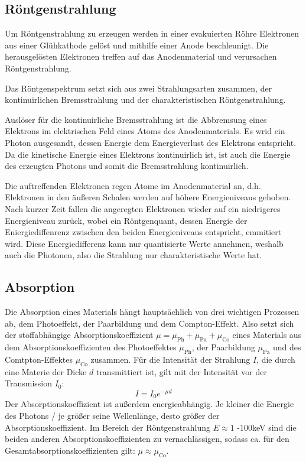 \documentclass[titlepage = firstcover]{scrartcl}
\begin{document}
      \subsection{Röntgenstrahlung}
        Um Röntgenstrahlung zu erzeugen werden in einer evakuierten Röhre Elektronen aus einer Glühkathode gelöst und mithilfe einer Anode beschleunigt. Die herausgelösten Elektronen treffen auf das Anodenmaterial und verursachen Röntgenstrahlung.

        Das Röntgenspektrum setzt sich aus zwei Strahlungsarten zusammen, der kontinuirlichen Bremsstrahlung und der charakteristischen Röntgenstrahlung.

        Auslöser für die kontinuirliche Bremsstrahlung ist die Abbremsung eines Elektrons im elektrischen Feld eines Atoms des Anodenmaterials. Es wrid ein Photon ausgesandt, dessen Energie dem Energieverlust des Elektrons entspricht. Da die kinetische Energie eines Elektrons kontinuirlich ist, ist auch die Energie des erzeugten Photons und somit die Bremsstrahlung kontinuirlich.

        Die auftreffenden Elektronen regen Atome im Anodenmaterial an, d.h. Elektronen in den äußeren Schalen werden auf höhere Energieniveaus gehoben. Nach kurzer Zeit fallen die angeregten Elektronen wieder auf ein niedrigeres Energieniveau zurück, wobei ein Röntgenquant, dessen Energie der Eniergiediffenrenz zwischen den beiden Energieniveaus entspricht, emmitiert wird. Diese Energiedifferenz kann nur quantisierte Werte annehmen, weshalb auch die Photonen, also die Strahlung nur charakteristische Werte hat.

      \subsection{Absorption}
        Die Absorption eines Materials hängt hauptsächlich von drei wichtigen Prozessen ab, dem Photoeffekt, der Paarbildung und dem Compton-Effekt. Also setzt sich der stoffabhängige Absorptionskoeffizient $\mu = \mu_\text{Ph} + \mu_\text{Pa} + \mu_\text{Co}$ eines Materials aus dem Absorptionskoeffizienten des Photoeffektes $\mu_\text{Ph}$, der Paarbildung $\mu_\text{Pa}$ und des Comtpton-Effektes $\mu_\text{Co}$ zusammen. Für die Intensität der Strahlung $I$, die durch eine Materie der Dicke $d$ transmittiert ist, gilt mit der Intensität vor der Transmission $I_0$:
        \begin{equation*}
          I = I_0 e^{-\mu d}
        \end{equation*}
        Der Absorptionskoeffizient ist außerdem energieabhängig. Je kleiner die Energie des Photons / je größer seine Wellenlänge, desto größer der Absorptionskoeffizient. Im Bereich der Röntgenstrahlung $E \approx 1$ -$100$keV sind die beiden anderen Absorptionskoeffizienten zu vernachlässigen, sodass ca. für den Gesamtabsorptionskoeffizienten gilt: $\mu \approx \mu_\text{Co}$.
\end{document}
